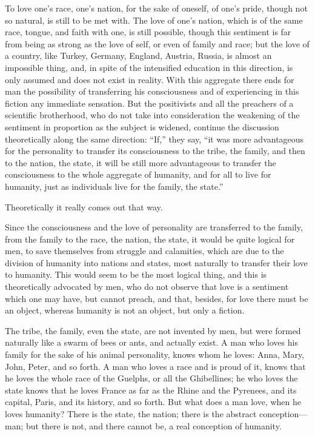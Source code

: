 \documentclass{book}
\begin{document}
To love one’s race, one’s nation, for the sake of oneself, of one’s pride, though not so natural, is still to be met with. The love of one’s nation, which is of the same race, tongue, and faith with one, is still possible, though this sentiment is far from being as strong as the love of self, or even of family and race; but the love of a country, like Turkey, Germany, England, Austria, Russia, is almost an impossible thing, and, in spite of the intensified education in this direction, is only assumed and does not exist in reality. With this aggregate there ends for man the possibility of transferring his consciousness and of experiencing in this fiction any immediate sensation. But the positivists and all the preachers of a scientific brotherhood, who do not take into consideration the weakening of the sentiment in proportion as the subject is widened, continue the discussion theoretically along the same direction: “If,” they say, “it was more advantageous for the personality to transfer its consciousness to the tribe, the family, and then to the nation, the state, it will be still more advantageous to transfer the consciousness to the whole aggregate of humanity, and for all to live for humanity, just as individuals live for the family, the state.”

Theoretically it really comes out that way.

Since the consciousness and the love of personality are transferred to the family, from the family to the race, the nation, the state, it would be quite logical for men, to save themselves from struggle and calamities, which are due to the division of humanity into nations and states, most naturally to transfer their love to humanity. This would seem to be the most logical thing, and this is theoretically advocated by men, who do not observe that love is a sentiment which one may have, but cannot preach, and that, besides, for love there must be an object, whereas humanity is not an object, but only a fiction.

The tribe, the family, even the state, are not invented by men, but were formed naturally like a swarm of bees or ants, and actually exist. A man who loves his family for the sake of his animal personality, knows whom he loves: Anna, Mary, John, Peter, and so forth. A man who loves a race and is proud of it, knows that he loves the whole race of the Guelphs, or all the Ghibellines; he who loves the state knows that he loves France as far as the Rhine and the Pyrenees, and its capital, Paris, and its history, and so forth. But what does a man love, when he loves humanity? There is the state, the nation; there is the abstract conception—man; but there is not, and there cannot be, a real conception of humanity.
\end{document}
